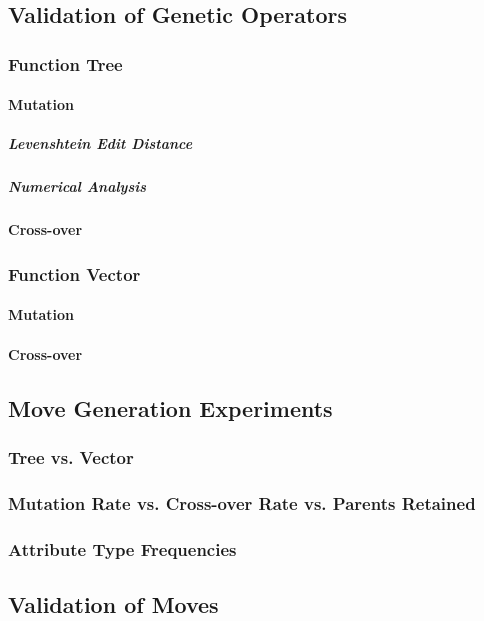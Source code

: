 \documentclass{acm_proc_article-sp}
\begin{document}
    \subsection{Validation of Genetic Operators}
        \subsubsection{Function Tree}
            \paragraph{Mutation}
                \subparagraph{Levenshtein Edit Distance}
                \subparagraph{Numerical Analysis}        
            \paragraph{Cross-over}
        \subsubsection{Function Vector}
            \paragraph{Mutation}
            \paragraph{Cross-over}
    
    \subsection{Move Generation Experiments}
    
        \subsubsection{Tree vs. Vector}
        \subsubsection{Mutation Rate vs. Cross-over Rate vs. Parents Retained}
        \subsubsection{Attribute Type Frequencies}
    
    \subsection{Validation of Moves}
        
\end{document}
